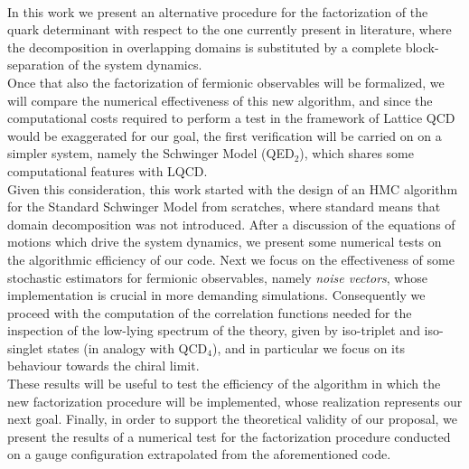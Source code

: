 \documentclass[corpo=11pt,english,numerazioneromana]{toptesi}
\begin{document}
\\ In this work we present an alternative procedure for the factorization of the quark determinant with respect to the one currently present in literature, where the decomposition in overlapping domains is substituted by a complete block-separation of the system dynamics.
\\ Once that also the factorization of fermionic observables will be formalized, we will compare the numerical effectiveness of this new algorithm, and since the computational costs required to perform a test in the framework of Lattice QCD would be exaggerated for our goal, the first verification will be carried on on a simpler system, namely the Schwinger Model (QED$_2$), which shares some computational features with LQCD.
\\ Given this consideration, this work started with the design of an HMC algorithm for the Standard Schwinger Model from scratches, where standard means that domain decomposition was not introduced. After a discussion of the equations of motions which drive the system dynamics, we present some numerical tests on the algorithmic efficiency of our code. Next we focus on the effectiveness of some stochastic estimators for fermionic observables, namely \textit{noise vectors}, whose implementation is crucial in more demanding simulations. Consequently we proceed with the computation of the correlation functions needed for the inspection of the low-lying spectrum of the theory, given by iso-triplet and iso-singlet states (in analogy with QCD$_4$), and in particular we focus on its behaviour towards the chiral limit.
\\ These results will be useful to test the efficiency of the algorithm in which the new factorization procedure will be implemented, whose realization represents our next goal. Finally, in order to support the theoretical validity of our proposal, we present the results of a numerical test for the factorization procedure conducted on a gauge configuration extrapolated from the aforementioned code.



\tableofcontents

\listoffigures

\listoftables
\end{document}
